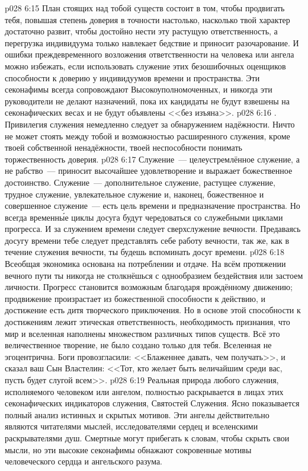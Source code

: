 \vs p028 6:15 \pc План стоящих над тобой существ состоит в том, чтобы продвигать тебя, повышая степень доверия в точности настолько, насколько твой характер достаточно развит, чтобы достойно нести эту растущую ответственность, а перегрузка индивидуума только навлекает бедствие и приносит разочарование. И ошибки преждевременного возложения ответственности на человека или ангела можно избежать, если использовать служение этих безошибочных оценщиков способности к доверию у индивидуумов времени и пространства. Эти секонафимы всегда сопровождают Высокоуполномоченных, и никогда эти руководители не делают назначений, пока их кандидаты не будут взвешены на секонафических весах и не будут объявлены <<без изъяна>>.
\vs p028 6:16 . Привилегия служения немедленно следует за обнаружением надёжности. Ничто не может стоять между тобой и возможностью расширенного служения, кроме твоей собственной ненадёжности, твоей неспособности понимать торжественность доверия.
\vs p028 6:17 Служение~--- целеустремлённое служение, а не рабство~--- приносит высочайшее удовлетворение и выражает божественное достоинство. Служение~--- дополнительное служение, растущее служение, трудное служение, увлекательное служение и, наконец, божественное и совершенное служение~--- есть цель времени и предназначение пространства. Но всегда временн\'ые циклы досуга будут чередоваться со служебными циклами прогресса. И за служением времени следует сверхслужение вечности. Предаваясь досугу времени тебе следует представлять себе работу вечности, так же, как в течение служения вечности, ты будешь вспоминать досуг времени.
\vs p028 6:18 \pc Всеобщая экономика основана на потреблении и отдаче. На всём протяжении вечного пути ты никогда не столкнёшься с однообразием бездействия или застоем личности. Прогресс становится возможным благодаря врождённому движению; продвижение произрастает из божественной способности к действию, и достижение есть дитя творческого приключения. Но в основе этой способности к достижениям лежит этическая ответственность, необходимость признания, что мир и вселенная наполнены множеством различных типов существ. Всё это величественное творение,  не было создано только для тебя. Вселенная не эгоцентрична. Боги провозгласили: <<Блаженнее давать, чем получать>>, и сказал ваш Сын Властелин: <<Тот, кто желает быть величайшим среди вас, пусть будет слугой всем>>.
\vs p028 6:19 \pc Реальная природа любого служения, исполняемого человеком или ангелом, полностью раскрывается в лицах этих секонафических индикаторов служения, Святостей Служения. Ясно показывается полный анализ истинных и скрытых мотивов. Эти ангелы действительно являются читателями мыслей, исследователями сердец и вселенскими раскрывателями душ. Смертные могут прибегать к словам, чтобы скрыть свои мысли, но эти высокие секонафимы обнажают сокровенные мотивы человеческого сердца и ангельского разума.

